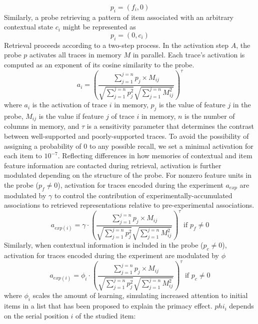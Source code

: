 {}$$p_i = (f_i, 0)$$\markdownRendererInterblockSeparator
{}Similarly, a probe retrieving a pattern of item associated with an arbitrary contextual state $c_i$ might be represented as\markdownRendererInterblockSeparator
{}$$p_i = (0, c_i)$$\markdownRendererInterblockSeparator
{}Retrieval proceeds according to a two-step process. In the activation step $A$, the probe $p$ activates all traces in memory $M$ in parallel. Each trace's activation is computed as an exponent of its cosine similarity to the probe.\markdownRendererInterblockSeparator
{}$$a_i = \left({\frac {\sum^{j=n}_{j=1}{p_j \times M_{ij}}} {\sqrt{\sum^{j=n}_{j=1}{p^2_j}} \sqrt{\sum^{j=n}_{j=1}{M^2_{ij}}}}}\right)^{\tau}$$\markdownRendererInterblockSeparator
{}where $a_i$ is the activation of trace $i$ in memory, $p_j$ is the value of feature $j$ in the probe, $M_{ij}$ is the value if feature $j$ of trace $i$ in memory, $n$ is the number of columns in memory, and $\tau$ is a sensitivity parameter that determines the contrast between well-supported and poorly-supported traces. To avoid the possibility of assigning a probability of 0 to any possible recall, we set a minimal activation for each item to $10^{-7}$.\markdownRendererInterblockSeparator
{}Reflecting differences in how memories of contextual and item feature information are contacted during retrieval, activation is further modulated depending on the structure of the probe. For nonzero feature units in the probe ($p_f \neq 0$), activation for traces encoded during the experiment $a_{exp}$ are modulated by $\gamma$ to control the contribution of experimentally-accumulated associations to retrieved representations relative to pre-experimental associations.\markdownRendererInterblockSeparator
{}$$a_{exp(i)} = \gamma \cdot \left({\frac {\sum^{j=n}_{j=1}{p_j \times M_{ij}}} {\sqrt{\sum^{j=n}_{j=1}{p^2_j}} \sqrt{\sum^{j=n}_{j=1}{M^2_{ij}}}}}\right)^{\tau} \text{ if } p_f \neq 0$$\markdownRendererInterblockSeparator
{}Similarly, when contextual information is included in the probe ($p_c \neq 0$), activation for traces encoded during the experiment are modulated by $\phi$\markdownRendererInterblockSeparator
{}$$a_{exp(i)} = \phi_i \cdot \left({\frac {\sum^{j=n}_{j=1}{p_j \times M_{ij}}} {\sqrt{\sum^{j=n}_{j=1}{p^2_j}} \sqrt{\sum^{j=n}_{j=1}{M^2_{ij}}}}}\right)^{\tau} \text{ if } p_c \neq 0$$\markdownRendererInterblockSeparator
{}where $\phi_i$ scales the amount of learning, simulating increased attention to initial items in a list that has been proposed to explain the primacy effect. $phi_i$ depends on the serial position $i$ of the studied item:\markdownRendererInterblockSeparator
